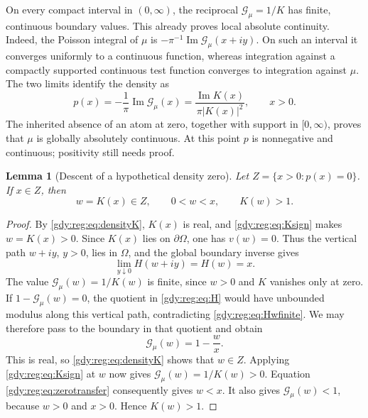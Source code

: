 \documentclass[11pt]{article}
\numberwithin{equation}{section}
\newtheorem{lemma}[theorem]{Lemma}
\theoremstyle{definition}
\theoremstyle{remark}
\DeclareMathOperator{\Ima}{Im}
\begin{document}
On every compact interval in $(0,\infty)$, the reciprocal
$\mathcal G_\mu=1/K$ has finite, continuous boundary values.  This already
proves local absolute continuity.  Indeed, the Poisson integral of $\mu$
is $-\pi^{-1}\Ima \mathcal G_\mu(x+iy)$.  On such an interval
it converges uniformly to a continuous function, whereas integration
against a compactly supported continuous test function converges to
integration against $\mu$.  The two limits identify the density as
\begin{equation}\label{gdy:reg:eq:densityK}
 p(x)=-\frac1\pi\Ima \mathcal G_\mu(x)
      =\frac{\Ima K(x)}{\pi|K(x)|^2},\qquad x>0.
\end{equation}
The inherited absence of an atom at zero, together with support in
$[0,\infty)$, proves that $\mu$ is globally absolutely continuous.
At this point $p$ is nonnegative and continuous; positivity still needs
proof.

\begin{lemma}[Descent of a hypothetical density zero]
\label{gdy:reg:lem:descent}
Let $Z=\{x>0:p(x)=0\}$.  If $x\in Z$, then
\begin{equation}\label{gdy:reg:eq:descent}
 w=K(x)\in Z,\qquad 0<w<x,\qquad K(w)>1.
\end{equation}
\end{lemma}
\begin{proof}
By \eqref{gdy:reg:eq:densityK}, $K(x)$ is real, and
\eqref{gdy:reg:eq:Ksign} makes $w=K(x)>0$.
Since $K(x)$ lies on $\partial\Omega$, one has $v(w)=0$.
Thus the vertical path $w+iy$, $y>0$, lies in $\Omega$, and the global
boundary inverse gives
\begin{equation}\label{gdy:reg:eq:Hwfinite}
 \lim_{y\downarrow0}H(w+iy)=H(w)=x.
\end{equation}
The value $\mathcal G_\mu(w)=1/K(w)$ is finite, since $w>0$ and
$K$ vanishes only at zero.  If
$1-\mathcal G_\mu(w)=0$, the quotient in \eqref{gdy:reg:eq:H} would have
unbounded modulus along this vertical path, contradicting
\eqref{gdy:reg:eq:Hwfinite}.  We may therefore pass to the boundary in that
quotient and obtain
\begin{equation}\label{gdy:reg:eq:zerotransfer}
 \mathcal G_\mu(w)=1-\frac wx.
\end{equation}
This is real, so \eqref{gdy:reg:eq:densityK} shows that $w\in Z$.
Applying \eqref{gdy:reg:eq:Ksign} at $w$ now gives
$\mathcal G_\mu(w)=1/K(w)>0$.  Equation
\eqref{gdy:reg:eq:zerotransfer} consequently gives $w<x$.
It also gives $\mathcal G_\mu(w)<1$, because $w>0$ and $x>0$.
Hence $K(w)>1$.
\end{proof}
\end{document}
